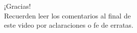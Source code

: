 \documentclass[aspectratio=169]{beamer}
\begin{document}
\begin{frame}[plain]
\begin{center}
\vspace{2cm}
\huge ¡Gracias!\\
\vspace{2cm}
\normalsize Recuerden leer los comentarios al final de \\ este video por aclaraciones o fe de erratas.
\end{center}
\end{frame}
\end{document}
